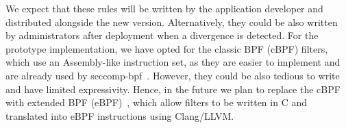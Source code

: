 We expect that these rules will be written by the application developer and
distributed alongside the new version. Alternatively, they could
be also written by administrators after deployment when a divergence is
detected. For the prototype implementation, we have opted for the classic BPF
(cBPF) filters, which use an Assembly-like instruction set, as they are easier
to implement and are already used by seccomp-bpf~\cite{seccomp-bpf:linux}.
However, they could be also tedious to write and have limited expressivity.
Hence, in the future we plan to replace the cBPF with extended BPF
(eBPF)~\cite{ebpf:linux}, which allow filters to be written in C and translated
into eBPF instructions using Clang/LLVM.


